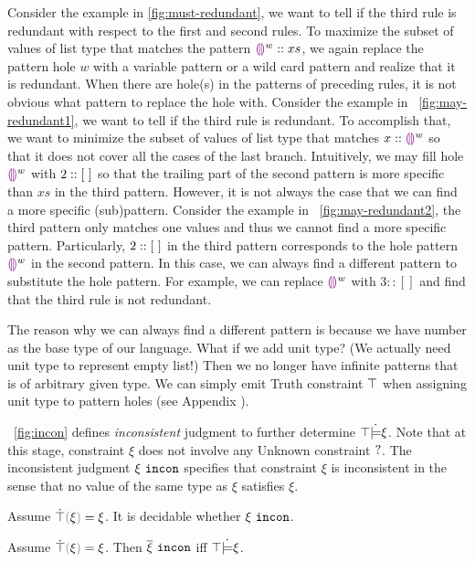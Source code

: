 Consider the example in \autoref{fig:must-redundant}, we want to tell if the third rule is redundant with respect to the first and second rules. To maximize the subset of values of list type that matches the pattern $\textcolor{violet}{\llparenthesis}\textcolor{violet}{\rrparenthesis}^{w}::xs$, we again replace the pattern hole $w$ with a variable pattern or a wild card pattern and realize that it is redundant. When there are hole(s) in the patterns of preceding rules, it is not obvious what pattern to replace the hole with. Consider the example in \figurename~\ref{fig:may-redundant1}, we want to tell if the third rule is redundant. To accomplish that, we want to minimize the subset of values of list type that matches $x::\textcolor{violet}{\llparenthesis}\textcolor{violet}{\rrparenthesis}^{w}$ so that it does not cover all the cases of the last branch. Intuitively, we may fill hole $\textcolor{violet}{\llparenthesis}\textcolor{violet}{\rrparenthesis}^{w}$ with $2::[~]$ so that the trailing part of the second pattern is more specific than $xs$ in the third pattern. However, it is not always the case that we can find a more specific (sub)pattern. Consider the example in \figurename~\ref{fig:may-redundant2}, the third pattern only matches one values and thus we cannot find a more specific pattern. Particularly, $2::[~]$ in the third pattern corresponds to the hole pattern $\textcolor{violet}{\llparenthesis}\textcolor{violet}{\rrparenthesis}^{w}$ in the second pattern. In this case, we can always find a different pattern to substitute the hole pattern. For example, we can replace $\textcolor{violet}{\llparenthesis}\textcolor{violet}{\rrparenthesis}^{w}$ with $3::[]$ and find that the third rule is not redundant.

The reason why we can always find a different pattern is because we have number as the base type of our language. What if we add unit type? (We actually need unit type to represent empty list!) Then we no longer have infinite patterns that is of arbitrary given type. We can simply emit Truth constraint $\top$ when assigning unit type to pattern holes (see Appendix \todo{}).

\figurename~\ref{fig:incon} defines \textit{inconsistent} judgment to further determine $\top \dot{\models} \xi$. Note that at this stage, constraint $\xi$ does not involve any Unknown constraint $\mathtt{?}$. The inconsistent judgment $\xi ~\mathtt{incon}$ specifies that constraint $\xi$ is inconsistent in the sense that no value of the same type as $\xi$ satisfies $\xi$.



\begin{theorem}
\textbf{}  Assume $\ctruify{\xi}=\xi$. It is decidable whether $\xi ~\mathtt{incon}$.
\end{theorem}

\begin{theorem}
  Assume $\ctruify{\xi}=\xi$. Then $\overline{\xi} ~\mathtt{incon}$ iff $\top \dot{\models} \xi$.
\end{theorem}
